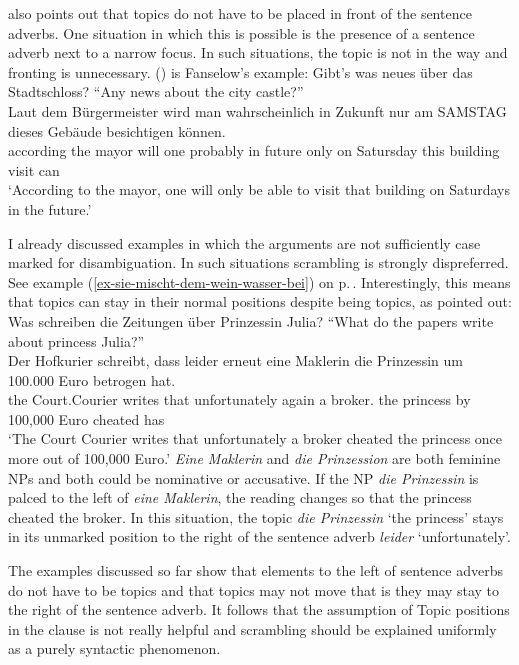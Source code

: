 \citet{Fanselow2006a} also points out that topics do not have to be placed in front of the sentence
adverbs. One situation in which this is possible is the presence of a sentence adverb next to a
narrow focus. In such situations, the topic is not in the way and fronting is unnecessary. ()
is Fanselow's example:
\ea
Gibt's was neues über das Stadtschloss? ``Any news about the city castle?''\\
\gll Laut dem Bürgermeister wird man wahrscheinlich in Zukunft nur am SAMSTAG dieses Gebäude besichtigen können.\\ 
     according the mayor will one probably in future only on Satursday this building visit can\\
\glt `According to the mayor, one will only be able to visit that building on Saturdays in the future.'
\z

\noindent
I already discussed examples in which the arguments are not sufficiently case marked for
disambiguation. In such situations scrambling is strongly dispreferred. See example (\ref{ex-sie-mischt-dem-wein-wasser-bei}) on p.\,\pageref{ex-sie-mischt-dem-wein-wasser-bei}. Interestingly, this means
that topics can stay in their normal positions despite being topics, as \citet{Fanselow2006a}
pointed out:
\largerpage[2]
\ea
Was schreiben die Zeitungen über Prinzessin Julia? ``What do the papers write about princess Julia?''\\
\gll Der Hofkurier     schreibt, dass leider        erneut eine Maklerin    die Prinzessin um 100.000 Euro betrogen hat.\\
     the Court.Courier writes    that unfortunately again  a    broker.\F{} the princess   by 100,000 Euro cheated has\\
\glt `The Court Courier writes that unfortunately a broker cheated the princess once more out of 100,000 Euro.'
\z
\emph{Eine Maklerin} and \emph{die Prinzession} are both feminine NPs and both could be nominative or
accusative. If the NP \emph{die Prinzessin} is palced to the left of \emph{eine Maklerin}, the reading changes so that the princess cheated the
broker. In this situation, the topic \emph{die Prinzessin} `the princess' stays in its unmarked position to the right of the
sentence adverb \emph{leider} `unfortunately'. 

The examples discussed so far show that elements to the left of
sentence adverbs do not have to be topics and that topics may not move that is they may stay to the
right of the sentence adverb. It follows that the assumption of Topic positions in the clause is not
really helpful and scrambling should be explained uniformly as a purely syntactic phenomenon.

